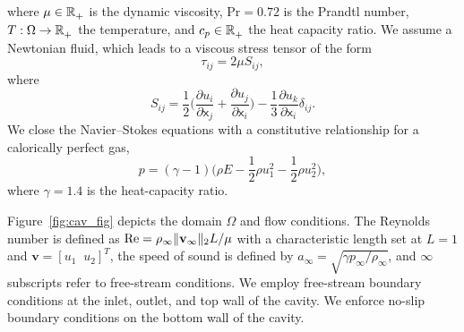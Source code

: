 where $\mu \in \mathbb{R}^{}_{+}$ is the dynamic viscosity, $\text{Pr} = 0.72$ is the Prandtl number, $T : \Omega \rightarrow \mathbb{R}^{}_{+}$ the temperature, and $c_p \in \mathbb{R}^{}_{+}$ the heat capacity ratio.
We assume a Newtonian fluid, which leads to a viscous stress tensor of the form
\begin{equation*}
\tau_{ij} = 2\mu S_{ij},
\end{equation*}
where
\begin{equation*}
 S_{ij} = \frac{1}{2} \big( \frac{\partial u_i}{\partial \mathsf{x}_j} + \frac{\partial u_j}{\partial \mathsf{x}_i} \big) - \frac{1}{3} \frac{\partial      u_k}{\partial \mathsf{x}_i} \delta_{ij}.
\end{equation*}
We close the Navier--Stokes equations with a constitutive relationship for a calorically perfect gas,
$$p = (\gamma - 1)( \rho E - \frac{1}{2} \rho u_1^2 - \frac{1}{2} \rho u_2^2 \big),$$
where $\gamma = 1.4$ is the heat-capacity ratio.

Figure~\ref{fig:cav_fig} depicts the domain $\Omega$ and flow conditions. The Reynolds number is defined as $\text{Re} = \rho_{\infty} \| \mathbf{v}_{\infty} \|_2 L / \mu$ with a characteristic length set at $L=1$ and $\mathbf{v} = [u_1 \; \; u_2]^T$, the speed of sound is defined by $a_{\infty} = \sqrt{\gamma p_{\infty}/\rho_{\infty}}$, and $\infty$ subscripts refer to free-stream conditions. We employ free-stream boundary conditions at the inlet, outlet, and top wall of the cavity. We enforce no-slip boundary conditions 
on the bottom wall of the cavity. 

